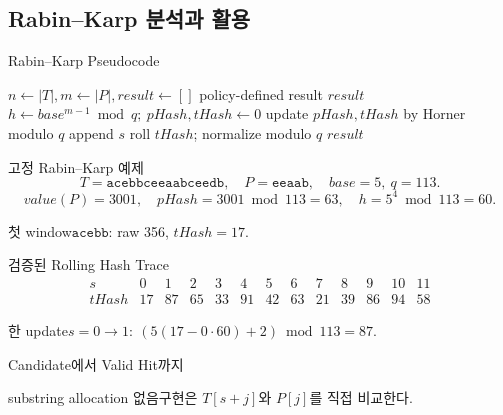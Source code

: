 \subsection{Rabin--Karp 분석과 활용}
\begin{frame}{Rabin--Karp Pseudocode}
\tiny\begin{algorithmic}[1]
\State \(n\gets|T|,m\gets|P|,result\gets[]\)
\State\Return policy-defined result\EndIf
{}\State\Return \(result\)\EndIf
\State \(h\gets base^{m-1}\bmod q;\ pHash,tHash\gets0\)
\State update \(pHash,tHash\) by Horner modulo \(q\)\EndFor
{}
\State append \(s\)\EndIf
{}\State roll \(tHash\); normalize modulo \(q\)\EndIf
\EndFor\State\Return \(result\)\EndProcedure
\end{algorithmic}
\end{frame}
\begin{frame}{고정 Rabin--Karp 예제}
\[
T=\texttt{acebbceeaabceedb},\quad P=\texttt{eeaab},\quad base=5,\ q=113.
\]
\[
value(P)=3001,\quad pHash=3001\bmod113=63,\quad h=5^4\bmod113=60.
\]
\begin{block}{첫 window}\(\texttt{acebb}\): raw 356, \(tHash=17\).\end{block}
\end{frame}
\begin{frame}{검증된 Rolling Hash Trace}
\scriptsize\[
\begin{array}{c|rrrrrrrrrrrr}
s&0&1&2&3&4&5&6&7&8&9&10&11\\\hline
tHash&17&87&65&33&91&42&63&21&39&86&94&58
\end{array}
\]
\begin{block}{한 update}\(s=0\to1:\ (5(17-0\cdot60)+2)\bmod113=87\).\end{block}
\end{frame}
\begin{frame}{Candidate에서 Valid Hit까지}
\centering{}
\begin{alertblock}{substring allocation 없음}구현은 \(T[s+j]\)와 \(P[j]\)를 직접 비교한다.\end{alertblock}
\end{frame}

